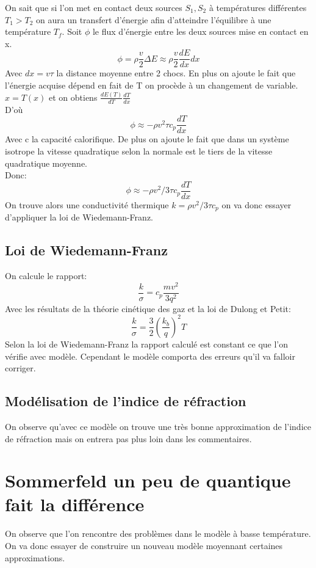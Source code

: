 On sait que si l'on met en contact deux sources $S_1, S_2$ à températures différentes $T_1>T_2$ on aura un transfert d'énergie afin d'atteindre l'équilibre à une température $T_f$. Soit $\phi$ le flux d'énergie entre les deux sources mise en contact en x.
$$\phi =\rho \frac{v}{2}\Delta E \approx \rho \frac{v}{2} \frac{dE}{dx}dx$$ Avec $dx=v\tau$ la distance moyenne entre 2 chocs. En plus on ajoute le fait que l'énergie acquise dépend en fait de T on procède à un changement de variable. $ x=T(x)$  et on obtiens $\frac{dE(T)}{dT}\frac{dT}{dx}$\\
D'où 
$$\phi \approx -\rho v^2 \tau c_p \frac{dT}{dx}$$
Avec c la capacité calorifique. De plus on ajoute le fait que dans un système isotrope la vitesse quadratique selon la normale est le tiers de la vitesse quadratique moyenne.\\
Donc:
$$\phi \approx -\rho v^2/3 \tau c_p \frac{dT}{dx}$$
On trouve alors une conductivité thermique $k=\rho v^2/3 \tau c_p$ on va donc essayer d'appliquer la loi de Wiedemann-Franz.

\subsection{Loi de Wiedemann-Franz}

On calcule le rapport:
$$\frac{k}{\sigma}=c_p\frac{mv^2}{3q^2}$$
Avec les résultats de la théorie cinétique des gaz et la loi de Dulong et Petit:
$$\frac{k}{\sigma}=\frac{3}{2}\left(\frac{k_b}{q}\right)^2T$$
Selon la loi de Wiedemann-Franz la rapport calculé est constant ce que l'on vérifie avec modèle. Cependant le modèle comporta des erreurs qu'il va falloir corriger.

\subsection{Modélisation de l'indice de réfraction}

On observe qu'avec ce modèle on trouve une très bonne approximation de l'indice de réfraction mais on entrera pas plus loin dans les commentaires.


\section{Sommerfeld un peu de quantique fait la différence}


On observe que l'on rencontre des problèmes dans le modèle à basse température. On va donc essayer de construire un nouveau modèle moyennant certaines approximations.

